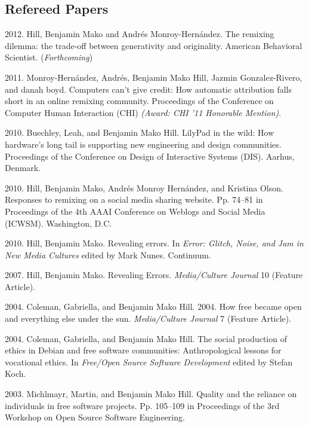 \documentclass[11pt]{article}
\newenvironment{cvlist}{
\begin{list}{}{\leftmargin=3.0em \itemindent=-3.0em}
  \setlength{\itemsep}{0pt}
  \setlength{\parskip}{0em}
  \setlength{\parsep}{1em}
  \setlength{\parindent}{0em}}
{\vspace{1em}
\end{list}}
\begin{document}
\subsection{Refereed Papers}
\begin{cvlist}
\item 2012. Hill, Benjamin Mako and Andrés Monroy-Hernández.
  The remixing dilemma: the trade-off between generativity and
  originality. American Behavioral Scientist. (\emph{Forthcoming})
\item 2011. Monroy-Hernández, Andrés, Benjamin Mako Hill, Jazmin
  Gonzalez-Rivero, and danah boyd. Computers can't give credit: How
  automatic attribution falls short in an online remixing
  community. Proceedings of the Conference on Computer Human
  Interaction (CHI) \emph{(Award: CHI '11 Honorable Mention)}.
\item 2010. Buechley, Leah, and Benjamin Mako Hill. LilyPad in the wild:
  How hardware's long tail is supporting new engineering and design
  communities. Proceedings of the Conference on Design of Interactive
  Systems (DIS). Aarhus, Denmark.
\item 2010. Hill, Benjamin Mako, Andrés Monroy Hernández, and Kristina
  Olson. Responses to remixing on a social media sharing
  website. Pp. 74--81 in Proceedings of the 4th AAAI Conference on
  Weblogs and Social Media (ICWSM). Washington, D.C.
\item 2010. Hill, Benjamin Mako. Revealing errors. In \emph{Error:
    Glitch, Noise, and Jam in New Media Cultures} edited by Mark
  Nunes. Continuum. %
\item 2007. Hill, Benjamin Mako. Revealing Errors. \emph{Media/Culture
    Journal} 10 (Feature Article).
\item 2004. Coleman, Gabriella, and Benjamin Mako Hill. 2004. How free
  became open and everything else under the sun. \emph{Media/Culture
    Journal} 7 (Feature Article).
\item 2004. Coleman, Gabriella, and Benjamin Mako Hill. The social
  production of ethics in Debian and free software communities:
  Anthropological lessons for vocational ethics. In \emph{Free/Open
    Source Software Development} edited by Stefan Koch.
\item 2003. Michlmayr, Martin, and Benjamin Mako Hill. Quality and the
  reliance on individuals in free software projects. Pp. 105--109 in
  Proceedings of the 3rd Workshop on Open Source Software Engineering.
\end{cvlist}
\end{document}
